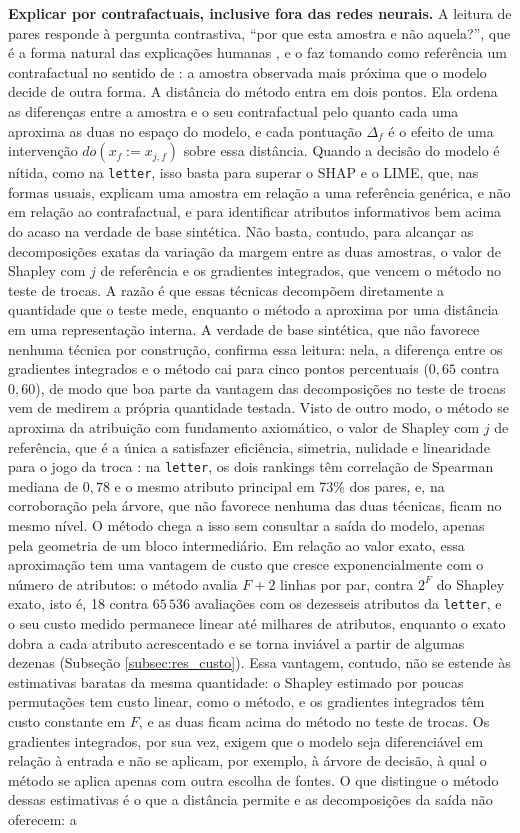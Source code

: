 \textbf{Explicar por contrafactuais, inclusive fora das redes neurais.} A leitura de pares responde à pergunta contrastiva, ``por que esta amostra e não aquela?'', que é a forma natural das explicações humanas \citep{Miller2019}, e o faz tomando como referência um contrafactual no sentido de \cite{Guidotti2022}: a amostra observada mais próxima que o modelo decide de outra forma. A distância do método entra em dois pontos. Ela ordena as diferenças entre a amostra e o seu contrafactual pelo quanto cada uma aproxima as duas no espaço do modelo, e cada pontuação $\Delta_f$ é o efeito de uma intervenção $do(x_f := x_{j,f})$ sobre essa distância. Quando a decisão do modelo é nítida, como na \texttt{letter}, isso basta para superar o SHAP e o LIME, que, nas formas usuais, explicam uma amostra em relação a uma referência genérica, e não em relação ao contrafactual, e para identificar atributos informativos bem acima do acaso na verdade de base sintética. Não basta, contudo, para alcançar as decomposições exatas da variação da margem entre as duas amostras, o valor de Shapley com $j$ de referência e os gradientes integrados, que vencem o método no teste de trocas. A razão é que essas técnicas decompõem diretamente a quantidade que o teste mede, enquanto o método a aproxima por uma distância em uma representação interna. A verdade de base sintética, que não favorece nenhuma técnica por construção, confirma essa leitura: nela, a diferença entre os gradientes integrados e o método cai para cinco pontos percentuais ($0{,}65$ contra $0{,}60$), de modo que boa parte da vantagem das decomposições no teste de trocas vem de medirem a própria quantidade testada. Visto de outro modo, o método se aproxima da atribuição com fundamento axiomático, o valor de Shapley com $j$ de referência, que é a única a satisfazer eficiência, simetria, nulidade e linearidade para o jogo da troca \citep{SundararajanNajmi2020}: na \texttt{letter}, os dois rankings têm correlação de Spearman mediana de $0{,}78$ e o mesmo atributo principal em 73\% dos pares, e, na corroboração pela árvore, que não favorece nenhuma das duas técnicas, ficam no mesmo nível. O método chega a isso sem consultar a saída do modelo, apenas pela geometria de um bloco intermediário. Em relação ao valor exato, essa aproximação tem uma vantagem de custo que cresce exponencialmente com o número de atributos: o método avalia $F + 2$ linhas por par, contra $2^F$ do Shapley exato, isto é, 18 contra $65\,536$ avaliações com os dezesseis atributos da \texttt{letter}, e o seu custo medido permanece linear até milhares de atributos, enquanto o exato dobra a cada atributo acrescentado e se torna inviável a partir de algumas dezenas (Subseção \ref{subsec:res_custo}). Essa vantagem, contudo, não se estende às estimativas baratas da mesma quantidade: o Shapley estimado por poucas permutações tem custo linear, como o método, e os gradientes integrados têm custo constante em $F$, e as duas ficam acima do método no teste de trocas. Os gradientes integrados, por sua vez, exigem que o modelo seja diferenciável em relação à entrada e não se aplicam, por exemplo, à árvore de decisão, à qual o método se aplica apenas com outra escolha de fontes. O que distingue o método dessas estimativas é o que a distância permite e as decomposições da saída não oferecem: a 